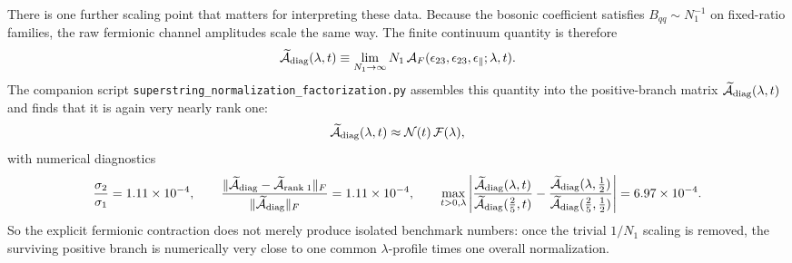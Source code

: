\documentclass[11pt]{article}
\numberwithin{equation}{section}
\begin{document}
There is one further scaling point that matters for interpreting these data.
Because the bosonic coefficient satisfies $B_{qq}\sim N_1^{-1}$ on fixed-ratio
families, the raw fermionic channel amplitudes scale the same way. The finite
continuum quantity is therefore
\begin{equation}
\label{eq:s15-1-038h}
\widetilde{\cal A}_{\rm diag}(\lambda,t)
\equiv
\lim_{N_1\to\infty}
N_1\,{\cal A}_F(\epsilon_{23},\epsilon_{23},\epsilon_\parallel;\lambda,t).
\end{equation}
The companion script
\texttt{superstring\_normalization\_factorization.py} assembles this quantity
into the positive-branch matrix $\widetilde{\cal A}_{\rm diag}(\lambda,t)$ and
finds that it is again very nearly rank one:
\begin{equation}
\label{eq:s15-1-038i}
\widetilde{\cal A}_{\rm diag}(\lambda,t)\approx {\cal N}(t)\,{\cal F}(\lambda),
\end{equation}
with numerical diagnostics
\begin{equation}
\label{eq:s15-1-038j}
\frac{\sigma_2}{\sigma_1}=1.11\times 10^{-4},
\qquad
\frac{\|\widetilde{\cal A}_{\rm diag}-\widetilde{\cal A}_{\rm rank\;1}\|_F}
{\|\widetilde{\cal A}_{\rm diag}\|_F}
=1.11\times 10^{-4},
\qquad
\max_{t>0,\lambda}
\left|
\frac{\widetilde{\cal A}_{\rm diag}(\lambda,t)}
{\widetilde{\cal A}_{\rm diag}(\frac25,t)}
-
\frac{\widetilde{\cal A}_{\rm diag}(\lambda,\frac12)}
{\widetilde{\cal A}_{\rm diag}(\frac25,\frac12)}
\right|
=6.97\times 10^{-4}.
\end{equation}
So the explicit fermionic contraction does not merely produce isolated
benchmark numbers: once the trivial $1/N_1$ scaling is removed, the surviving
positive branch is numerically very close to one common $\lambda$-profile times
one overall normalization.
\end{document}
